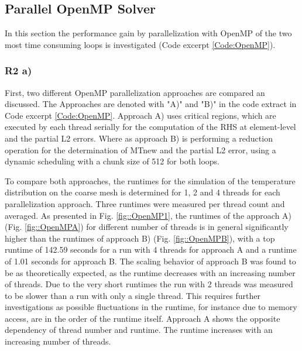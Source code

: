 \documentclass[a4paper, 11pt, oneside]{scrartcl}
\newcommand{\refFig}[1]{Fig. \ref{#1}}
\newcommand{\refCode}[1]{Code excerpt \ref{#1}}
\begin{document}
\subsection{Parallel OpenMP Solver}

In this section the performance gain by parallelization with OpenMP of the two most time consuming loops is investigated (\refCode{Code:OpenMP}).  

\subsubsection{R2 a)}

First, two different OpenMP parallelization approaches are compared an discussed. The Approaches are denoted with "A)" and "B)" in the code extract in \refCode{Code:OpenMP}. Approach A) uses critical regions, which are executed by each thread serially for the computation of the RHS at element-level and the partial L2 errors. Where as approach B) is performing a reduction operation for the determination of MTnew and the partial L2 error, using a dynamic scheduling with a chunk size of 512 for both loops. 

To compare both approaches, the runtimes for the simulation of the temperature distribution on the coarse mesh is determined for 1, 2 and 4 threads for each parallelization approach. Three runtimes were measured per thread count and averaged. 
As presented in \refFig{fig::OpenMP1}, the runtimes of the approach A) (\refFig{fig::OpenMPA}) for different number of threads is in general significantly higher than the runtimes of approach B) (\refFig{fig::OpenMPB}), with a top runtime of 142.59 seconds for a run with 4 threads for approach A and a runtime of 1.01 seconds for approach B. The scaling behavior of approach B was found to be as theoretically expected, as the runtime decreases with an increasing number of threads. Due to the very short runtimes the run with 2 threads was measured to be slower than a run with only a single thread. This requires further investigations as possible fluctuations in the runtime, for instance due to memory access, are in the order of the runtime itself. Approach A shows the opposite dependency of thread number and runtime. The runtime increases with an increasing number of threads. 
\end{document}
